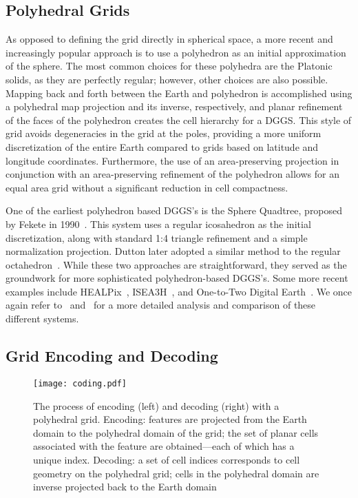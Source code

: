 \subsection{Polyhedral Grids}
As opposed to defining the grid directly in spherical space, a more recent and increasingly popular approach is to use a polyhedron as an initial approximation of the sphere.
The most common choices for these polyhedra are the Platonic solids, as they are perfectly regular; however, other choices are also possible.
Mapping back and forth between the Earth and polyhedron is accomplished using a polyhedral map projection and its inverse, respectively, and planar refinement of the faces of the polyhedron creates the cell hierarchy for a DGGS.
This style of grid avoids degeneracies in the grid at the poles, providing a more uniform discretization of the entire Earth compared to grids based on latitude and longitude coordinates.
Furthermore, the use of an area-preserving projection in conjunction with an area-preserving refinement of the polyhedron allows for an equal area grid without a significant reduction in cell compactness.


One of the earliest polyhedron based DGGS's is the Sphere Quadtree, proposed by Fekete in 1990~\cite{fekete1990sphere}.
This system uses a regular icosahedron as the initial discretization, along with standard 1:4 triangle refinement and a simple normalization projection.
Dutton later adopted a similar method to the regular octahedron~\cite{dutton1996encoding}.
While these two approaches are straightforward, they served as the groundwork for more sophisticated polyhedron-based DGGS's.
Some more recent examples include HEALPix~\cite{gorski2005healpix}, ISEA3H~\cite{sahr2003geodesic}, and One-to-Two Digital Earth~\cite{mahdavi2013one}.
We once again refer to~\cite{mahdavi2015survey} and~\cite{alderson2020digital} for a more detailed analysis and comparison of these different systems.


\subsection{Grid Encoding and Decoding}

\begin{figure}[tb]
	\texttt{[image: coding.pdf]}
	\caption[Grid Encoding and Decoding with a Polyhedral Grid]{
		The process of encoding (left) and decoding (right) with a polyhedral grid.
		Encoding: features are projected from the Earth domain to the polyhedral domain of the grid; the set of planar cells associated with the feature are obtained---each of which has a unique index.
		Decoding: a set of cell indices corresponds to cell geometry on the polyhedral grid; cells in the polyhedral domain are inverse projected back to the Earth domain
	}
	\label{fig:coding}
\end{figure}



